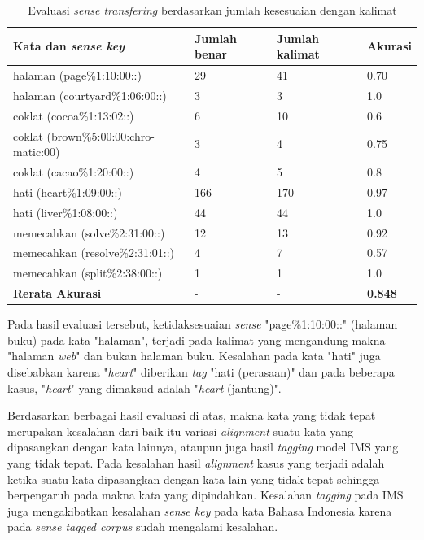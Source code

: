 \begin{table}
	\centering
	\caption{Evaluasi \textit{sense transfering} berdasarkan jumlah kesesuaian dengan kalimat}
	\label{table:evaluasi-sense-transfer-2}
	\begin{tabular}{|p{4cm}|p{2.85cm}|p{2.85cm}|p{1.4cm}|}
		\hline
		\textbf{Kata dan \textit{sense key}} & \textbf{Jumlah benar} & \textbf{Jumlah kalimat} & \textbf{Akurasi}
		\\ \hline
		halaman (page\%1:10:00::) & 29 & 41 & 0.70 \\ \hline
		halaman (courtyard\%1:06:00::) & 3 & 3 & 1.0 \\ \hline
		coklat (cocoa\%1:13:02::) & 6 & 10 & 0.6 \\ \hline
		coklat (brown\%5:00:00:chro-matic:00) & 3 & 4 & 0.75 \\ \hline
		coklat (cacao\%1:20:00::) & 4 & 5 & 0.8 \\ \hline
		hati (heart\%1:09:00::) & 166 & 170 & 0.97 \\ \hline
		hati (liver\%1:08:00::) & 44 & 44 & 1.0 \\ \hline
		memecahkan (solve\%2:31:00::) & 12 & 13 & 0.92 \\ \hline
		memecahkan (resolve\%2:31:01::) & 4 & 7 & 0.57 \\ \hline
		memecahkan (split\%2:38:00::) & 1 & 1 & 1.0 \\ \hline
		\hline
		\textbf{Rerata Akurasi} & - & - & \textbf{0.848} \\ \hline
	\end{tabular}
\end{table}

Pada hasil evaluasi tersebut, ketidaksesuaian \textit{sense} "page\%1:10:00::" (halaman buku) pada kata "halaman", terjadi pada kalimat yang mengandung makna "halaman \textit{web}" dan bukan halaman buku. Kesalahan pada kata "hati" juga disebabkan karena "\textit{heart}" diberikan \textit{tag} "hati (perasaan)" dan pada beberapa kasus, "\textit{heart}" yang dimaksud adalah "\textit{heart} (jantung)".
 
Berdasarkan berbagai hasil evaluasi di atas, makna kata yang tidak tepat merupakan kesalahan dari baik itu variasi \textit{alignment} suatu kata yang dipasangkan dengan kata lainnya, ataupun juga hasil \textit{tagging} model IMS yang yang tidak tepat. Pada kesalahan hasil \textit{alignment} kasus yang terjadi adalah ketika suatu kata dipasangkan dengan kata lain yang tidak tepat sehingga berpengaruh pada makna kata yang dipindahkan. Kesalahan \textit{tagging} pada IMS juga mengakibatkan kesalahan \textit{sense key} pada kata Bahasa Indonesia karena pada \textit{sense tagged corpus} sudah mengalami kesalahan.
